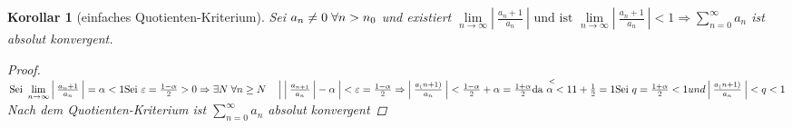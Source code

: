 \documentclass[a4paper,titlepage,oneside]{article}
\renewcommand{\epsilon}{\ensuremath{\varepsilon}}
\def\fa{\ensuremath{\forall}}
\def\sp{\hspace{0,1cm}}
\newcommand{\suminf}[2][n]{\ensuremath{\sum_{#1= 0}^{\infty}{#2}}}
\renewcommand{\liminf}[2][n]{\ensuremath{\lim\limits_{#1 \rightarrow \infty}{#2}}}
\newcommand{\abs}[1]{\ensuremath{\left|\:#1\:\right|}}
\theoremstyle{thmstyle}
\newtheorem{korr}[satz]{Korollar}
\begin{document}
\begin{korr}[einfaches Quotienten-Kriterium]
Sei \(a_n \ne 0 \sp \fa n > n_0\) und existiert \(\liminf{\abs{\frac{a_n+1}{a_n}}}\text{ und ist }\liminf{\abs{\frac{a_n+1}{a_n}}} < 1
\Rightarrow \suminf{a_n}\) ist absolut konvergent.
\begin{proof}
\begin{math}
\text{Sei } \liminf{\abs{\frac{a_n+1}{a_n}}} = \alpha < 1 \\
\text{Sei } \epsilon = \frac{1 - \alpha}{2} > 0 \Rightarrow \exists N \sp \forall n \ge N \quad \abs{\abs{\frac{a_{n+1}}{a_n}} - \alpha} < \epsilon  = \frac{1-\alpha}{2}
\Rightarrow \abs{\frac{a_(n+1)}{a_n}} < \frac{1-\alpha}{2} + \alpha = \frac{1+\alpha}{2} \overset{<}{\text{da } \alpha < 1} 1+\frac{1}{2} = 1
\text{Sei } q = \frac{1 + \alpha}{2} < 1 und \abs{\frac{a_(n+1)}{a_n}} < q < 1
\end{math}
Nach dem Quotienten-Kriterium ist \suminf{a_n} absolut konvergent
\end{proof}
\end{korr}
\end{document}
